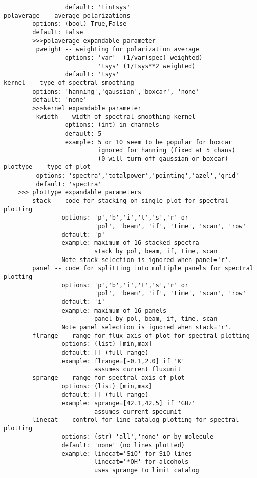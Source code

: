 \begin{verbatim}
                 default: 'tintsys'
polaverage -- average polarizations
        options: (bool) True,False
        default: False
        >>>polaverage expandable parameter
         pweight -- weighting for polarization average
                 options: 'var'  (1/var(spec) weighted)
                          'tsys' (1/Tsys**2 weighted)
                 default: 'tsys'
kernel -- type of spectral smoothing
        options: 'hanning','gaussian','boxcar', 'none'
        default: 'none'
        >>>kernel expandable parameter
         kwidth -- width of spectral smoothing kernel
                 options: (int) in channels
                 default: 5
                 example: 5 or 10 seem to be popular for boxcar
                          ignored for hanning (fixed at 5 chans)
                          (0 will turn off gaussian or boxcar)
plottype -- type of plot
         options: 'spectra','totalpower','pointing','azel','grid'
         default: 'spectra'
    >>> plottype expandable parameters
        stack -- code for stacking on single plot for spectral plotting
                options: 'p','b','i','t','s','r' or
                         'pol', 'beam', 'if', 'time', 'scan', 'row'
                default: 'p'
                example: maximum of 16 stacked spectra
                         stack by pol, beam, if, time, scan
                Note stack selection is ignored when panel='r'.
        panel -- code for splitting into multiple panels for spectral plotting
                options: 'p','b','i','t','s','r' or
                         'pol', 'beam', 'if', 'time', 'scan', 'row'
                default: 'i'
                example: maximum of 16 panels
                         panel by pol, beam, if, time, scan
                Note panel selection is ignored when stack='r'.
        flrange -- range for flux axis of plot for spectral plotting
                options: (list) [min,max]
                default: [] (full range)
                example: flrange=[-0.1,2.0] if 'K'
                         assumes current fluxunit
        sprange -- range for spectral axis of plot
                options: (list) [min,max]
                default: [] (full range)
                example: sprange=[42.1,42.5] if 'GHz'
                         assumes current specunit
        linecat -- control for line catalog plotting for spectral plotting
                options: (str) 'all','none' or by molecule
                default: 'none' (no lines plotted)
                example: linecat='SiO' for SiO lines
                         linecat='*OH' for alcohols
                         uses sprange to limit catalog

\end{verbatim}
